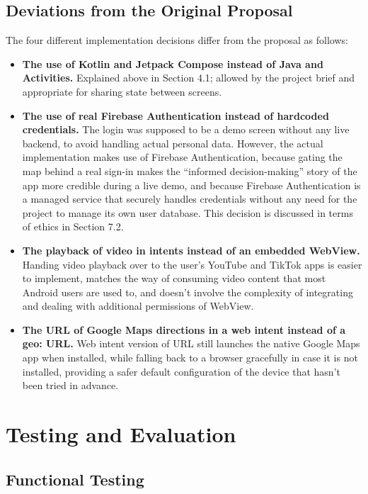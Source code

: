 \documentclass[12pt, a4paper]{article}
\begin{document}
\subsection{Deviations from the Original Proposal}

The four different implementation decisions differ from the proposal as follows:

\begin{itemize}
    \item \textbf{The use of Kotlin and Jetpack Compose instead of Java and Activities.} Explained above in Section 4.1; allowed by the project brief and appropriate for sharing state between screens.
    \item \textbf{The use of real Firebase Authentication instead of hardcoded credentials.} The login was supposed to be a demo screen without any live backend, to avoid handling actual personal data. However, the actual implementation makes use of Firebase Authentication, because gating the map behind a real sign-in makes the ``informed decision-making'' story of the app more credible during a live demo, and because Firebase Authentication is a managed service that securely handles credentials without any need for the project to manage its own user database. This decision is discussed in terms of ethics in Section 7.2.
    \item \textbf{The playback of video in intents instead of an embedded WebView.} Handing video playback over to the user's YouTube and TikTok apps is easier to implement, matches the way of consuming video content that most Android users are used to, and doesn't involve the complexity of integrating and dealing with additional permissions of WebView.
    \item \textbf{The URL of Google Maps directions in a web intent instead of a geo: URL.} Web intent version of URL still launches the native Google Maps app when installed, while falling back to a browser gracefully in case it is not installed, providing a safer default configuration of the device that hasn't been tried in advance.
\end{itemize}

\section{Testing and Evaluation}

\subsection{Functional Testing}
\end{document}
